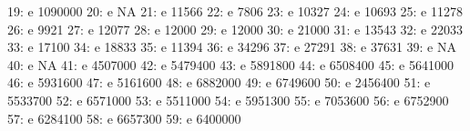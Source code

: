 \documentclass[nojss]{jss}
\begin{document}
\begin{Schunk}
\begin{Soutput}
 19:                               e                    1090000
 20:                               e                         NA
 21:                               e                      11566
 22:                               e                       7806
 23:                               e                      10327
 24:                               e                      10693
 25:                               e                      11278
 26:                               e                       9921
 27:                               e                      12077
 28:                               e                      12000
 29:                               e                      12000
 30:                               e                      21000
 31:                               e                      13543
 32:                               e                      22033
 33:                               e                      17100
 34:                               e                      18833
 35:                               e                      11394
 36:                               e                      34296
 37:                               e                      27291
 38:                               e                      37631
 39:                               e                         NA
 40:                               e                         NA
 41:                               e                    4507000
 42:                               e                    5479400
 43:                               e                    5891800
 44:                               e                    6508400
 45:                               e                    5641000
 46:                               e                    5931600
 47:                               e                    5161600
 48:                               e                    6882000
 49:                               e                    6749600
 50:                               e                    2456400
 51:                               e                    5533700
 52:                               e                    6571000
 53:                               e                    5511000
 54:                               e                    5951300
 55:                               e                    7053600
 56:                               e                    6752900
 57:                               e                    6284100
 58:                               e                    6657300
 59:                               e                    6400000

\end{Soutput}
\end{Schunk}
\end{document}
